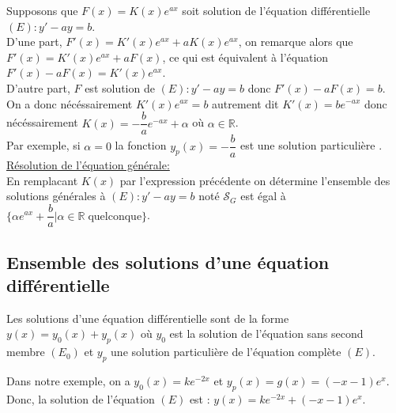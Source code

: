 \documentclass[french]{book}
\newcommand{\cals}{\mathscr{S}}
\begin{document}
Supposons que $F(x)=K(x)e^{ax}$ soit solution de l'équation différentielle $(E): y'-ay=b$. \\

D'une part, $F'(x)=K'(x)e^{ax}+aK(x)e^{ax}$, on remarque alors que $F'(x)=K'(x)e^{ax}+aF(x)$, ce qui est équivalent à l'équation $F'(x)-aF(x)=K'(x)e^{ax}$.\\

D'autre part, $F$ est solution de $(E): y'-ay=b$ donc $F'(x)-aF(x)=b$. \\

On a donc nécéssairement $K'(x)e^{ax}=b$  autrement dit $K'(x)=be^{-ax}$ donc  nécéssairement $K(x)=- \dfrac{b}{a}e^{-ax} + \alpha $ où $\alpha \in \mathbb{R}$. \\

Par exemple, si $\alpha=0$ la fonction $y_p(x)=-\dfrac{b}{a}$ est une solution particulière . \\


\underline{Résolution de l'équation générale:}\\

En remplacant $K(x)$ par l'expression précédente on détermine  l'ensemble des solutions générales à $(E): y'-ay=b $ noté $\cals_G$ est égal à $\{ \alpha e^{ax} + \dfrac{b}{a}   \vert  \alpha \in \mathbb{R} \; \text{quelconque} \}$.

 

 






\subsection{Ensemble des solutions d'une équation différentielle}

\begin{thm}
Les solutions d'une équation différentielle sont de la forme $y(x)=y_0(x)+y_p(x)$ où $y_0$ est la solution de l'équation sans second membre $(E_0)$ et $y_p$ une solution particulière de l'équation complète $(E)$.
\end{thm}

\begin{exemple}
Dans notre exemple, on a $y_0(x)=ke^{-2x}$ et $y_p(x)=g(x)=(-x-1)e^x$. \\
Donc, la solution de l'équation $(E)$ est : $y(x)=ke^{-2x}+(-x-1)e^x$.
\end{exemple}


\end{document}
